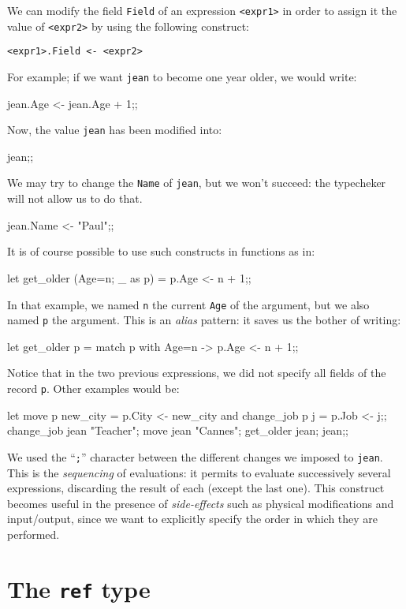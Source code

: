 We can modify the field {\tt Field} of an expression \verb"<expr1>" in order
to assign it the value of \verb"<expr2>" by using the following construct:
\begin{verbatim}
<expr1>.Field <- <expr2>
\end{verbatim}
For example; if we want {\tt jean} to become one year older, we would write:
\begin{caml_example}
jean.Age <- jean.Age + 1;;
\end{caml_example}
Now, the value {\tt jean} has been modified into:
\begin{caml_example}
jean;;
\end{caml_example}
We may try to change the {\tt Name} of {\tt jean}, but we won't succeed: the
typecheker will not allow us to do that.
\begin{caml_example}
jean.Name <- "Paul";;
\end{caml_example}
It is of course possible to use such constructs in functions as in:
\begin{caml_example}
let get_older ({Age=n; _} as p) = p.Age <- n + 1;;
\end{caml_example}
In that example, we named {\tt n} the current {\tt Age} of the argument, but
we also named {\tt p} the argument. This is an {\em alias} pattern: it
saves us the bother of writing:
\begin{caml_example}
let get_older p =
    match p with {Age=n} -> p.Age <- n + 1;;
\end{caml_example}
Notice that in the two previous expressions, we did not specify all
fields of the record {\tt p}.
Other examples would be:
\begin{caml_example}
let move p new_city = p.City <- new_city
and change_job p j = p.Job <- j;;
change_job jean "Teacher"; move jean "Cannes";
get_older jean; jean;;
\end{caml_example}
We used the ``{\tt ;}'' character between the different changes we
imposed to {\tt jean}. This is the {\em sequencing} of evaluations: it
permits to evaluate successively several expressions, discarding the
result of each (except the last one). This construct becomes useful in
the presence of {\em side-effects} such as physical modifications and
input/output, since we want to explicitly specify the order in which
they are performed.

\section{The {\tt ref} type}

